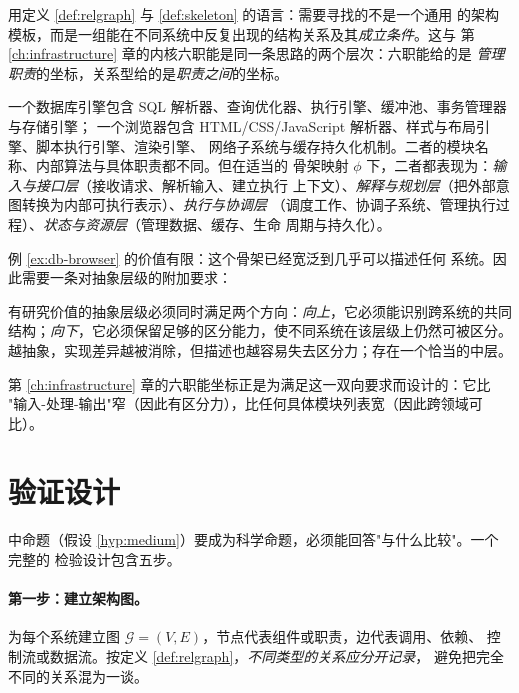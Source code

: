 用定义 \ref{def:relgraph} 与 \ref{def:skeleton} 的语言：需要寻找的不是一个通用
的架构模板，而是一组能在不同系统中反复出现的结构关系及其\emph{成立条件}。这与
第 \ref{ch:infrastructure} 章的内核六职能是同一条思路的两个层次：六职能给的是
\emph{管理职责}的坐标，关系型给的是\emph{职责之间}的坐标。

\begin{example}[数据库与浏览器的抽象骨架]\label{ex:db-browser}
一个数据库引擎包含 SQL 解析器、查询优化器、执行引擎、缓冲池、事务管理器与存储引擎；
一个浏览器包含 HTML/CSS/JavaScript 解析器、样式与布局引擎、脚本执行引擎、渲染引擎、
网络子系统与缓存持久化机制。二者的模块名称、内部算法与具体职责都不同。但在适当的
骨架映射 $\phi$ 下，二者都表现为：\emph{输入与接口层}（接收请求、解析输入、建立执行
上下文）、\emph{解释与规划层}（把外部意图转换为内部可执行表示）、\emph{执行与协调层}
（调度工作、协调子系统、管理执行过程）、\emph{状态与资源层}（管理数据、缓存、生命
周期与持久化）。
\end{example}

例 \ref{ex:db-browser} 的价值有限：这个骨架已经宽泛到几乎可以描述任何
系统。因此需要一条对抽象层级的附加要求：

\begin{principle}[抽象层级的双向约束]\label{pr:abstraction-level}
有研究价值的抽象层级必须同时满足两个方向：\emph{向上}，它必须能识别跨系统的共同
结构；\emph{向下}，它必须保留足够的区分能力，使不同系统在该层级上仍然可被区分。
越抽象，实现差异越被消除，但描述也越容易失去区分力；存在一个恰当的中层。
\end{principle}

第 \ref{ch:infrastructure} 章的六职能坐标正是为满足这一双向要求而设计的：它比
"输入-处理-输出"窄（因此有区分力），比任何具体模块列表宽（因此跨领域可比）。

\section{验证设计}\label{sec:baseline}

中命题（假设 \ref{hyp:medium}）要成为科学命题，必须能回答"与什么比较"。一个完整的
检验设计包含五步。

\paragraph{第一步：建立架构图。}
为每个系统建立图 $\mathcal{G} = (V, E)$，节点代表组件或职责，边代表调用、依赖、
控制流或数据流。按定义 \ref{def:relgraph}，\emph{不同类型的关系应分开记录}，
避免把完全不同的关系混为一谈。

